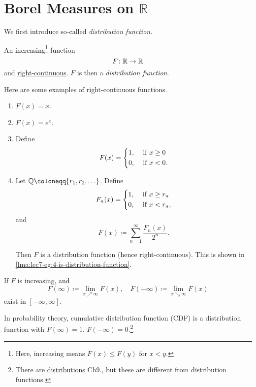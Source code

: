 \section{Borel Measures on \(\mathbb{R}\)}
We first introduce so-called \emph{distribution function}.

\begin{definition}\label{def:distribution-function}
	An \underline{increasing}\footnote{Here, increasing means \(F(x)\leq F(y)\) for \(x<y\).} function
	\[
		F\colon \mathbb{\MakeUppercase{R}} \to \mathbb{\MakeUppercase{R}}
	\]
	and \underline{right-continuous}. \(F\) is then a \emph{distribution function}.
\end{definition}

\begin{eg}
	Here are some examples of right-continuous functions.
	\begin{enumerate}
		\item \(F(x) = x\).
		\item \(F(x) = e^x\).
		\item Define
		      \[
			      F(x) = \begin{dcases}
				      1, & \text{ if } x\geq 0 \\
				      0, & \text{ if } x < 0.
			      \end{dcases}
		      \]
		      \item\label{eg:lec7-4} Let \(\mathbb{\MakeUppercase{Q}} \coloneqq \{r_1, r_2, \ldots  \}\). Define
		      \[
			      F_n(x) = \begin{dcases}
				      1, & \text{ if } x\geq r_n \\
				      0, & \text{ if } x < r_n,
			      \end{dcases}
		      \]
		      and
		      \[
			      F(x) \coloneqq \sum\limits_{n=1}^{\infty} \frac{F_n(x)}{2^n}.
		      \]

		      Then \(F\) is a distribution function (hence right-continuous). This is shown in \autoref{lma:lec7-eg:4-is-distribution-function}.
	\end{enumerate}
\end{eg}
\begin{note}
	If \(F\) is increasing, and
	\[
		F(\infty )\coloneqq \lim\limits_{x \nearrow \infty} F(x),\quad F(-\infty ) \coloneqq \lim\limits_{x \searrow \infty} F(x)
	\]
	exist in \([-\infty , \infty ]\).

	In probability theory, cumulative distribution function (CDF) is a distribution function with \(F(\infty ) = 1\), \(F(-\infty ) = 0\).\footnote{There are \underline{distributions} \cite{folland1999real} Ch9., but these are different from distribution functions.}
\end{note}

